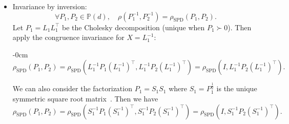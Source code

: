 \documentclass[entropy,article,accept,oneauthor,pdftex,entropy]{Definitions/mdpi}
\def\bbP{\mathbb{P}}
\def\SPD{\mathrm{SPD}}
\def\SPD{\mathrm{SPD}}
\begin{document}
\begin{itemize}
\begin{itemize}
\item Invariance by inversion:
$$
\forall P_1,P_2\in\bbP(d),\quad  \rho(P_1^{-1},P_2^{-1})=\rho_\SPD(P_1,P_2).
$$
Let $P_1=L_1L_1^\top$ be the Cholesky decomposition (unique when $P_1\succ 0$). 
Then apply the congruence invariance for $X=L_1^{-1}$:

\begin{adjustwidth}{-\extralength}{0cm}
\centering %
\begin{equation}
\rho_\SPD(P_1,P_2)=\rho_\SPD(L_1^{-1}P_1(L_1^{-1})^\top,L_1^{-1}P_2(L_1^{-1})^\top)=\rho_\SPD(I,L_1^{-1}P_2(L_1^{-1})^\top).
\end{equation}
\end{adjustwidth}
We can also consider the factorization $P_1=S_1S_1$ where $S_1=P_1^{\frac{1}{2}}$ is the unique symmetric square root matrix~\cite{dolcetti2020real}.
Then we have
$$
\rho_\SPD(P_1,P_2)=\rho_\SPD(S_1^{-1}P_1(S_1^{-1})^\top,S_1^{-1}P_2(S_1^{-1})^\top)=\rho_\SPD(I,S_1^{-1}P_2(S_1^{-1})^\top).
$$
\end{itemize}

 


\end{itemize}
\end{document}
